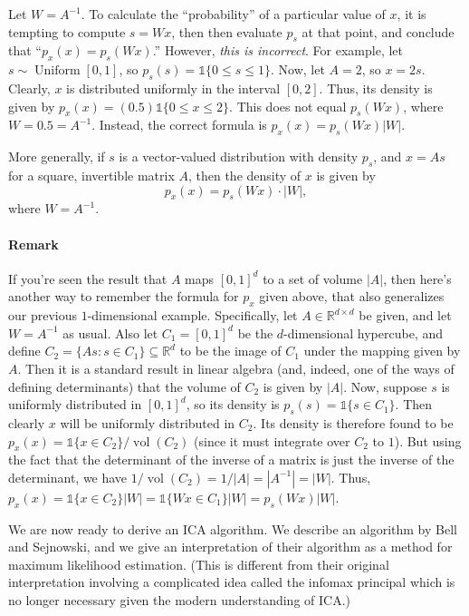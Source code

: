 Let $W = A^{-1}$. To calculate the ``probability'' of a particular value of $x$,
it is tempting to compute $s = Wx$, then then evaluate $p_s$ at that point, and
conclude that ``$p_x (x) = p_s(Wx)$.'' However, \textit{this is incorrect}. For example,
let $s \sim \operatorname{Uniform}[0,1]$, so $p_s(s) = \mathbb{1}\{0 \le s \le 1\}$. Now, let $A = 2$, so $x = 2s$.
Clearly, $x$ is distributed uniformly in the interval $[0,2]$. Thus, its density is
given by $p_x(x) = (0.5)\mathbb{1}\{0 \le x \le 2\}$. This does not equal $p_s(Wx)$, where
$W = 0.5 = A^{-1}$. Instead, the correct formula is $p_x (x) = p_s(Wx)|W|$.

More generally, if $s$ is a vector-valued distribution with density $p_s$, and
$x = As$ for a square, invertible matrix $A$, then the density of $x$ is given by
\[
    p_x (x) = p_s(Wx) \cdot |W|,
\]
where $W = A^{-1}$.

\paragraph{Remark} If you're seen the result that $A$ maps $[0,1]^d$ to a set of volume $|A|$,
then here's another way to remember the formula for $p_x$ given above, that also
generalizes our previous $1$-dimensional example. Specifically, let $A \in \mathbb R^{d \times d}$ be
given, and let $W = A^{-1}$ as usual. Also let $C_1 = [0,1]^d$ be the $d$-dimensional
hypercube, and define $C_2 = \{As : s \in C_1\} \subseteq \mathbb R^d$ to be the image of $C_1$
under the mapping given by $A$. Then it is a standard result in linear algebra
(and, indeed, one of the ways of defining determinants) that the volume of
$C_2$ is given by $|A|$. Now, suppose $s$ is uniformly distributed in $[0,1]^d$, so its
density is $p_s(s) = \mathbb{1}\{s \in C_1\}$. Then clearly $x$ will be uniformly distributed
in $C_2$. Its density is therefore found to be $p_x(x) = \mathbb{1}\{x \in C_2\}/\operatorname{vol}(C_2)$ (since
it must integrate over $C_2$ to $1$). But using the fact that the determinant
of the inverse of a matrix is just the inverse of the determinant, we have
$1/\operatorname{vol}(C_2) = 1/|A| = |A^{-1}| = |W|$. Thus, $p_x(x) = \mathbb{1}\{x \in C_2\}|W| = \mathbb{1}\{Wx \in
C_1\}|W| = p_s(Wx)|W|$.

\vspace{1cm}
We are now ready to derive an ICA algorithm. We describe an algorithm
by Bell and Sejnowski, and we give an interpretation of their algorithm as a %
method for maximum likelihood estimation. (This is different from their
original interpretation involving a complicated idea called the infomax principal
which is no longer necessary given the modern understanding of ICA.)


